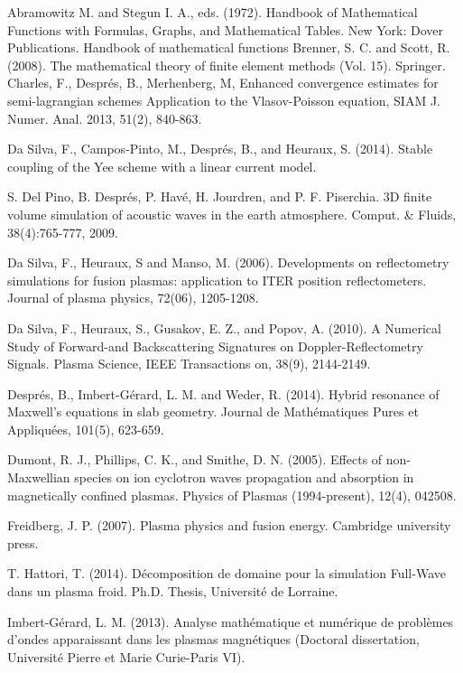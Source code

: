 \documentclass[proc]{edpsmath}
\begin{document}
\begin{thebibliography}{99}
	 Abramowitz M. and Stegun I. A., eds. (1972). Handbook of Mathematical Functions with Formulas, Graphs, and Mathematical Tables. New York: Dover Publications.
	Handbook of mathematical functions
	 Brenner, S. C. and Scott, R. (2008). The mathematical theory of finite element methods (Vol. 15). Springer.
Charles, F., Despr\'es, B., Merhenberg, M, 
Enhanced convergence estimates for semi-lagrangian schemes Application to the Vlasov-Poisson equation, SIAM J. Numer. Anal. 2013, 51(2), 840-863.

 Da Silva, F., Campos-Pinto, M., Després, B., and Heuraux, S. (2014). Stable coupling of the Yee scheme with a linear current model.

S. Del Pino, B. Despr\'es, P. Hav\'e, H. Jourdren, and P. F. Piserchia. 3D finite
volume simulation of acoustic waves in the earth atmosphere.
Comput. \&
Fluids, 38(4):765-777, 2009.

 Da Silva, F., Heuraux, S and  Manso, M. (2006). Developments on reflectometry simulations for fusion plasmas: application to ITER position reflectometers. Journal of plasma physics, 72(06), 1205-1208.

Da Silva, F., Heuraux, S., Gusakov, E. Z., and Popov, A. (2010). A Numerical Study of Forward-and Backscattering Signatures on Doppler-Reflectometry Signals. Plasma Science, IEEE Transactions on, 38(9), 2144-2149.

 Després, B., Imbert-Gérard, L. M. and Weder, R. (2014). Hybrid resonance of Maxwell's equations in slab geometry. Journal de Mathématiques Pures et Appliquées, 101(5), 623-659.

 Dumont, R. J., Phillips, C. K., and Smithe, D. N. (2005). Effects of non-Maxwellian species on ion cyclotron waves propagation and absorption in magnetically confined plasmas. Physics of Plasmas (1994-present), 12(4), 042508.

 Freidberg, J. P. (2007). Plasma physics and fusion energy. Cambridge university press.


T. Hattori, T. (2014).
D\'ecomposition de domaine pour la simulation Full-Wave dans un plasma froid.
Ph.D. Thesis, Universit\'e de
Lorraine.

 Imbert-Gérard, L. M. (2013). Analyse mathématique et numérique de problèmes d'ondes apparaissant dans les plasmas magnétiques (Doctoral dissertation, Université Pierre et Marie Curie-Paris VI).





\end{thebibliography}
\end{document}
